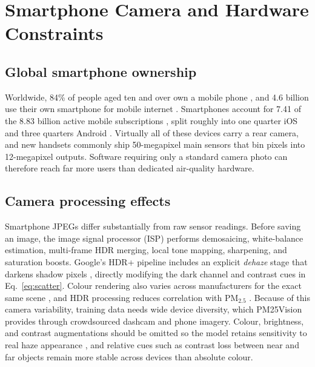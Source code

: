 \documentclass[conference]{IEEEtran}
\newcommand{\pmtwofive}{PM$_{2.5}$}
\begin{document}
\section{Smartphone Camera and Hardware Constraints}\label{sec:mobile}

\subsection{Global smartphone ownership}
Worldwide, 84\% of people aged ten and over own a mobile phone
\cite{itu2026facts}, and 4.6 billion use their own smartphone for mobile
internet \cite{gsma2026somic}. Smartphones account for 7.41 of the 8.83 billion
active mobile subscriptions \cite{ericsson2025mobility}, split roughly into one
quarter iOS and three quarters Android
\cite{counterpoint2026installed,statcounter2026os}. Virtually all of these
devices carry a rear camera, and new handsets commonly ship 50-megapixel main
sensors \cite{omdia2025cameras,counterpoint2024camera} that bin pixels into
12-megapixel outputs. Software requiring only a standard camera photo can
therefore reach far more users than dedicated air-quality hardware.

\subsection{Camera processing effects}
Smartphone JPEGs differ substantially from raw sensor readings. Before saving an
image, the image signal processor (ISP) performs demosaicing, white-balance
estimation, multi-frame HDR merging, local tone mapping, sharpening, and
saturation boosts. Google's HDR+ pipeline includes an explicit \emph{dehaze}
stage that darkens shadow pixels \cite{hasinoff2016hdrplus}, directly modifying
the dark channel and contrast cues in Eq.~\eqref{eq:scatter}. Colour rendering
also varies across manufacturers for the exact same scene
\cite{wang2023smartphonecolor}, and HDR processing reduces correlation with
\pmtwofive{} \cite{kambleMobileImageDrivenPM252025}. Because of this camera
variability, training data needs wide device diversity, which PM25Vision
provides through crowdsourced dashcam and phone imagery. Colour, brightness, and
contrast augmentations should be omitted so the model retains sensitivity to
real haze appearance \cite{bylerLocationGeneralizabilityImageBased2025}, and
relative cues such as contrast loss between near and far objects remain more
stable across devices than absolute colour.
\end{document}
